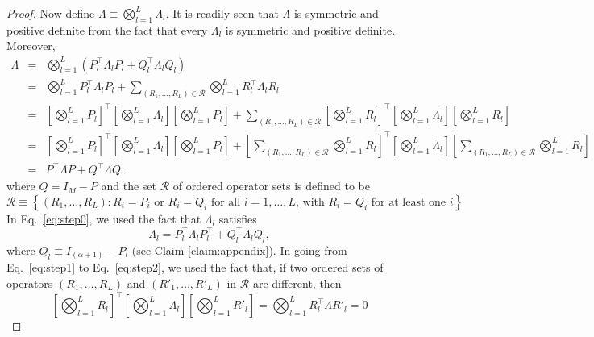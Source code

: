 \documentclass{article}
\numberwithin{myclaim}{section}
\newcommand{\eq}[1]{Eq.\ \ref{#1}}
\newcommand{\set}[1]{\left\{ #1 \right\}}
\begin{document}
\begin{proof}
Now define $\Lambda \equiv \bigotimes_{l=1}^L \Lambda_l$. It is readily seen that $\Lambda$ is symmetric and positive definite from the fact that every $\Lambda_l$ is symmetric and positive definite.  Moreover,
\begin{eqnarray}
\Lambda &=& \bigotimes_{l=1}^L (P_l^\top \Lambda_l P_l + Q_l^\top \Lambda_l Q_l) \label{eq:step0} \\
        &=& \bigotimes_{l=1}^L P_l^\top \Lambda_l P_l  + \sum_{(R_1, \ldots, R_L) \in \mathcal{R}} \bigotimes_{l=1}^L R_l^\top \Lambda_l R_l  \\
        &=& \left[ \bigotimes_{l=1}^L P_l \right]^\top \left[\bigotimes_{l=1}^L \Lambda_l \right] \left[ \bigotimes_{l=1}^L P_l \right] + \sum_{(R_1, \ldots, R_L) \in \mathcal{R}} \left[ \bigotimes_{l=1}^L R_l \right]^\top \left[\bigotimes_{l=1}^L \Lambda_l \right] \left[ \bigotimes_{l=1}^L R_l \right] \label{eq:step1} \\
        &=& \left[ \bigotimes_{l=1}^L P_l \right]^\top \left[\bigotimes_{l=1}^L \Lambda_l \right] \left[ \bigotimes_{l=1}^L P_l \right] +  \left[ \sum_{(R_1, \ldots, R_L) \in \mathcal{R}} \bigotimes_{l=1}^L R_l \right]^\top \left[\bigotimes_{l=1}^L \Lambda_l \right] \left[ \sum_{(R_1, \ldots, R_L) \in \mathcal{R}} \bigotimes_{l=1}^L R_l \right] \label{eq:step2} \\
        &=& P^\top \Lambda P + Q^\top \Lambda Q. \label{eq:step3}
\end{eqnarray}
where $Q = I_M - P$ and the set $\mathcal{R}$ of ordered operator sets is defined to be
\begin{equation}
    \mathcal{R} \equiv \set{ (R_1, \ldots, R_L): \textrm{$R_i = P_i$ or $R_i = Q_i$ for all $i=1,\ldots,L$, with $R_i = Q_i$ for at least one $i$}}.
\end{equation}
In \eq{eq:step0}, we used the fact that $\Lambda_l$ satisfies
\begin{equation}
    \Lambda_l = P_l^\top \Lambda_l P_l^\top + Q_l^\top \Lambda_l Q_l, \label{eq:Lambda_l_satisfies}
\end{equation}
where $Q_l \equiv I_{(\alpha+1)} - P_l$ (see Claim \ref{claim:appendix}). 
In going from \eq{eq:step1} to \eq{eq:step2}, we used the fact that, if two ordered sets of operators $(R_1, \ldots, R_L)$ and $(R'_1, \ldots, R'_L)$ in $\mathcal{R}$ are different, then
\begin{equation}
    \left[ \bigotimes_{l=1}^L R_l \right]^\top \left[\bigotimes_{l=1}^L \Lambda_l \right] \left[ \bigotimes_{l=1}^L R'_l \right] =\bigotimes_{l=1}^L R_l^\top \Lambda R'_l = 0 

\end{equation}
\end{proof}
\end{document}
